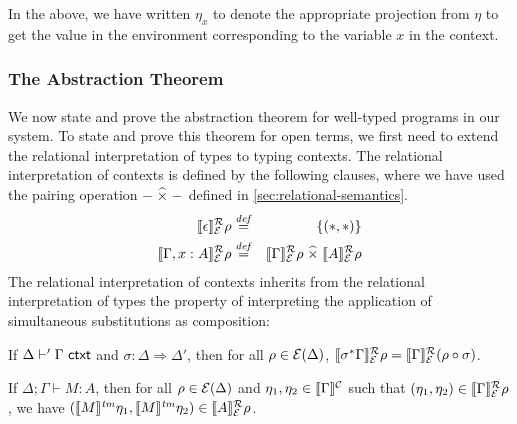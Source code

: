 In the above, we have written $\eta_x$ to denote the appropriate
projection from $\eta$ to get the value in the environment
corresponding to the variable $x$ in the context.

\subsubsection{The Abstraction Theorem}
\label{sec:abstraction-theorem}

We now state and prove the abstraction theorem for well-typed programs
in our system. To state and prove this theorem for open terms, we
first need to extend the relational interpretation of types to typing
contexts. The relational interpretation of contexts is defined by the
following clauses, where we have used the pairing operation
$-\mathrel{\widehat\times}-$ defined in \autoref{sec:relational-semantics}.
\begin{eqnarray*}
  \llbracket \epsilon \rrbracket^{\mathcal{R}}_{\mathcal{E}}{\rho} & \stackrel{\mathit{def}}= & \{(*,*)\} \\
  \llbracket \Gamma, x : A \rrbracket^{\mathcal{R}}_{\mathcal{E}}{\rho} & \stackrel{\mathit{def}}= & \llbracket \Gamma \rrbracket^{\mathcal{R}}_{\mathcal{E}}{\rho} \mathrel{\widehat\times} \llbracket A \rrbracket^{\mathcal{R}}_{\mathcal{E}}{\rho}
\end{eqnarray*}
The relational interpretation of contexts inherits from the relational
interpretation of types the property of interpreting the application
of simultaneous substitutions as composition:
\begin{lemma}\label{lem:ctxtsubst-rel}
  If $\Delta \vdash' \Gamma \textsf{ ctxt}$ and $\sigma : \Delta \Rightarrow
  \Delta'$, then for all $\rho \in \mathcal{E}(\Delta)$,
  $\llbracket \sigma^*\Gamma \rrbracket^{\mathcal{R}}_{\mathcal{E}}{\rho} =
  \llbracket \Gamma \rrbracket^{\mathcal{R}}_{\mathcal{E}}{(\rho \circ \sigma)}$.
\end{lemma}

\begin{theorem}[Abstraction]\label{thm:abstraction}
  If $\Delta; \Gamma \vdash M : A$, then for all $\rho \in
  \mathcal{E}(\Delta)$ and $\eta_1, \eta_2 \in \llbracket \Gamma \rrbracket^{\mathcal{C}}$ such
  that $(\eta_1, \eta_2) \in \llbracket \Gamma \rrbracket^{\mathcal{R}}_{\mathcal{E}}{\rho}$, we have
  $(\llbracket M \rrbracket^{\mathit{tm}}\eta_1, \llbracket M \rrbracket^{\mathit{tm}}\eta_2) \in \llbracket A \rrbracket^{\mathcal{R}}_{\mathcal{E}}{\rho}$.
\end{theorem}

